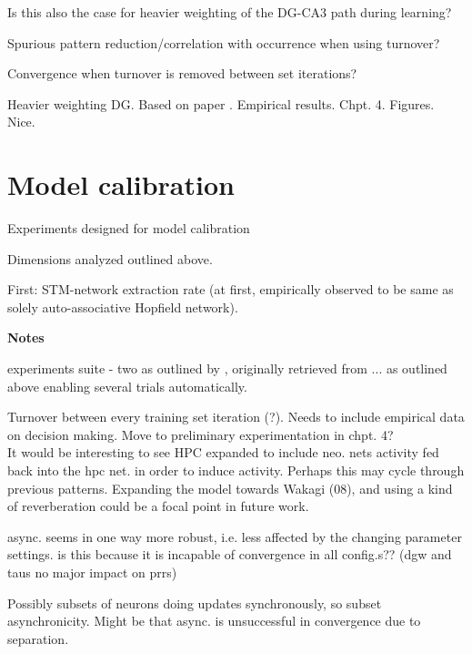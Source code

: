 Is this also the case for heavier weighting of the DG-CA3 path during learning?

Spurious pattern reduction/correlation with occurrence when using turnover?

Convergence when turnover is removed between set iterations?

Heavier weighting DG. Based on paper \citep{Norman2003}. Empirical results. Chpt. 4. Figures. Nice.

\section*{Model calibration}

Experiments designed for model calibration

Dimensions analyzed outlined above.

First: STM-network extraction rate (at first, empirically observed to be same as solely auto-associative Hopfield network).


\textbf{Notes}

experiments suite - two as outlined by \citep{Hattori2014}, originally retrieved from ... as outlined above
enabling several trials automatically.

Turnover between every training set iteration (?). Needs to include empirical data on decision making. Move to preliminary experimentation in chpt. 4?
\\

It would be interesting to see HPC expanded to include neo. nets activity fed back into the hpc net. in order to induce activity. Perhaps this may cycle through previous patterns. Expanding the model towards Wakagi (08), and using a kind of reverberation could be a focal point in future work.

async. seems in one way more robust, i.e. less affected by the changing parameter settings. is this because it is incapable of convergence in all config.s?? (dgw and taus no major impact on prrs)

Possibly subsets of neurons doing updates synchronously, so subset asynchronicity. Might be that async. is unsuccessful in convergence due to separation.


\cleardoublepage
